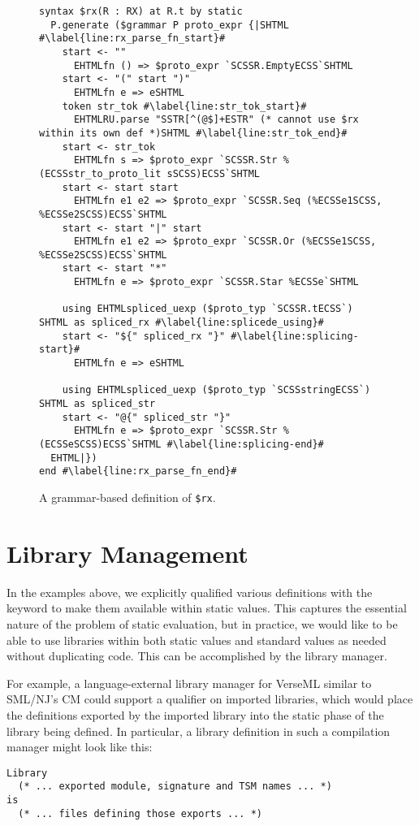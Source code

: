 {\begin{figure}[h!]
\vspace{-5px}
\begin{lstlisting}[deletekeywords={as}]
syntax $rx(R : RX) at R.t by static 
  P.generate ($grammar P proto_expr {|SHTML #\label{line:rx_parse_fn_start}#
    start <- ""
      EHTMLfn () => $proto_expr `SCSSR.EmptyECSS`SHTML
    start <- "(" start ")"
      EHTMLfn e => eSHTML
    token str_tok #\label{line:str_tok_start}#
      EHTMLRU.parse "SSTR[^(@$]+ESTR" (* cannot use $rx within its own def *)SHTML #\label{line:str_tok_end}#
    start <- str_tok
      EHTMLfn s => $proto_expr `SCSSR.Str %(ECSSstr_to_proto_lit sSCSS)ECSS`SHTML
    start <- start start
      EHTMLfn e1 e2 => $proto_expr `SCSSR.Seq (%ECSSe1SCSS, %ECSSe2SCSS)ECSS`SHTML
    start <- start "|" start 
      EHTMLfn e1 e2 => $proto_expr `SCSSR.Or (%ECSSe1SCSS, %ECSSe2SCSS)ECSS`SHTML
    start <- start "*"
      EHTMLfn e => $proto_expr `SCSSR.Star %ECSSe`SHTML

    using EHTMLspliced_uexp ($proto_typ `SCSSR.tECSS`) SHTML as spliced_rx #\label{line:splicede_using}#
    start <- "${" spliced_rx "}" #\label{line:splicing-start}#
      EHTMLfn e => eSHTML

    using EHTMLspliced_uexp ($proto_typ `SCSSstringECSS`) SHTML as spliced_str
    start <- "@{" spliced_str "}"
      EHTMLfn e => $proto_expr `SCSSR.Str %(ECSSeSCSS)ECSS`SHTML #\label{line:splicing-end}#
  EHTML|})
end #\label{line:rx_parse_fn_end}#
\end{lstlisting}
\vspace{-12px}
\caption{A grammar-based definition of \texttt{\$rx}.}
\vspace{-15px}
\label{fig:rx-grammar-based}
\end{figure}


\section{Library Management}
In the examples above, we explicitly qualified various definitions with the  keyword to make them available within static values. This captures the essential nature of the problem of static evaluation, but in practice, we would like to be able to use libraries within both static values and standard values as needed without duplicating code. This can be accomplished by the library manager.

For example, a language-external library manager for VerseML similar to SML/NJ's CM \cite{blume:smlnj-cm} could support a  qualifier on imported libraries, which would place the definitions exported by the imported library into the static phase of the library being defined. In particular, a library definition in such a compilation manager might look like this:
\begin{lstlisting}[numbers=none,morekeywords={Library,is}]
Library 
  (* ... exported module, signature and TSM names ... *)
is 
  (* ... files defining those exports ... *)


\end{lstlisting}}

